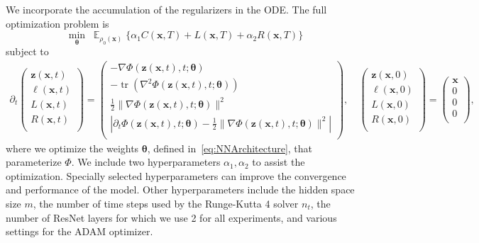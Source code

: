 \documentclass[letterpaper]{article}
\newcommand{\bfth}{\boldsymbol{\theta}}
\newcommand{\bfx}{\boldsymbol{x}}
\newcommand{\bfz}{\boldsymbol{z}}
\def\tr{\operatorname{tr}}
\newcommand{\E}{\ensuremath{\mathds{E}}}
\begin{document}
	We incorporate the accumulation of the regularizers in the ODE. The full optimization problem is
	\begin{equation}
		\min_{\bfth} \;\; \E_{\rho_0(\bfx)} \; \Big\{ \alpha_1 C(\bfx, T) + L(\bfx,T) + \alpha_2 R(\bfx,T) \Big\}
	\end{equation}
	subject to
	\begin{equation*}
		\renewcommand*{\arraystretch}{1.2} %
		\begin{split}
		\partial_t\begin{pmatrix}
		\bfz(\bfx,t)\\
		\ell(\bfx,t)\\
		L(\bfx,t) \\
		R(\bfx,t) \\
		\end{pmatrix}=\begin{pmatrix}
		- \nabla \Phi(\bfz(\bfx,t),t; \bfth)\\
		- \tr ( \nabla^2 \Phi(\bfz(\bfx,t),t; \bfth))\\
		\frac{1}{2}\| \nabla \Phi(\bfz(\bfx,t),t; \bfth) \|^2\\
		\left| \partial_t \Phi(\bfz(\bfx,t),t; \bfth) - \frac{1}{2}\|\nabla \Phi(\bfz(\bfx,t),t; \bfth)\|^2 \right|\\
		\end{pmatrix}, \quad 
		\begin{pmatrix}
			\bfz(\bfx,0)\\
			\ell(\bfx,0)\\
			L(\bfx,0) \\
			R(\bfx,0) \\
		\end{pmatrix} = 
		\begin{pmatrix}
			\bfx\\
			0\\
			0 \\
			0 \\
		\end{pmatrix},
		\end{split}
	\end{equation*} 
	where we optimize the weights $\bfth$, defined in~\eqref{eq:NNArchitecture}, that parameterize $\Phi$.
	We include two hyperparameters $\alpha_1,\alpha_2$ to assist the optimization. Specially selected hyperparameters can improve the convergence and performance of the model. Other hyperparameters include the hidden space size $m$, the number of time steps used by the Runge-Kutta 4 solver $n_t$, the number of ResNet layers for which we use 2 for all experiments, and various settings for the ADAM optimizer. 
\end{document}
